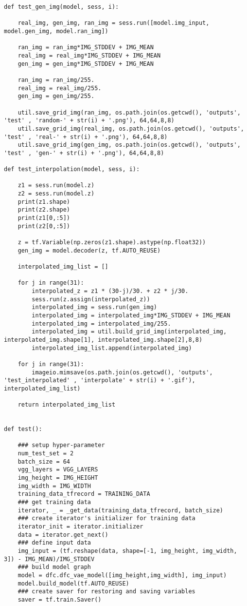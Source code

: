 \begin{footnotesize}
\begin{lstlisting}
def test_gen_img(model, sess, i):
    
    real_img, gen_img, ran_img = sess.run([model.img_input, model.gen_img, model.ran_img])
    
    ran_img = ran_img*IMG_STDDEV + IMG_MEAN
    real_img = real_img*IMG_STDDEV + IMG_MEAN
    gen_img = gen_img*IMG_STDDEV + IMG_MEAN
    
    ran_img = ran_img/255.
    real_img = real_img/255.
    gen_img = gen_img/255.
    
    util.save_grid_img(ran_img, os.path.join(os.getcwd(), 'outputs', 'test' , 'random-' + str(i) + '.png'), 64,64,8,8)
    util.save_grid_img(real_img, os.path.join(os.getcwd(), 'outputs', 'test' , 'real-' + str(i) + '.png'), 64,64,8,8)
    util.save_grid_img(gen_img, os.path.join(os.getcwd(), 'outputs', 'test' , 'gen-' + str(i) + '.png'), 64,64,8,8)
    
def test_interpolation(model, sess, i):
    
    z1 = sess.run(model.z)
    z2 = sess.run(model.z)
    print(z1.shape)
    print(z2.shape)
    print(z1[0,:5])
    print(z2[0,:5])
    
    z = tf.Variable(np.zeros(z1.shape).astype(np.float32))
    gen_img = model.decoder(z, tf.AUTO_REUSE)
    
    interpolated_img_list = []
    
    for j in range(31):
        interpolated_z = z1 * (30-j)/30. + z2 * j/30. 
        sess.run(z.assign(interpolated_z))
        interpolated_img = sess.run(gen_img)
        interpolated_img = interpolated_img*IMG_STDDEV + IMG_MEAN
        interpolated_img = interpolated_img/255.
        interpolated_img = util.build_grid_img(interpolated_img, interpolated_img.shape[1], interpolated_img.shape[2],8,8)
        interpolated_img_list.append(interpolated_img)
        
    for j in range(31):
        imageio.mimsave(os.path.join(os.getcwd(), 'outputs', 'test_interpolated' , 'interpolate' + str(i) + '.gif'), interpolated_img_list)
    
    return interpolated_img_list
    
    
def test():

    ### setup hyper-parameter
    num_test_set = 2
    batch_size = 64
    vgg_layers = VGG_LAYERS
    img_height = IMG_HEIGHT
    img_width = IMG_WIDTH
    training_data_tfrecord = TRAINING_DATA
    ### get training data 
    iterator, _ = _get_data(training_data_tfrecord, batch_size)
	### create iterator's initializer for training data 
    iterator_init = iterator.initializer
    data = iterator.get_next()
    ### define input data
    img_input = (tf.reshape(data, shape=[-1, img_height, img_width, 3]) - IMG_MEAN)/IMG_STDDEV
    ### build model graph
    model = dfc.dfc_vae_model([img_height,img_width], img_input)
    model.build_model(tf.AUTO_REUSE)
    ### create saver for restoring and saving variables
    saver = tf.train.Saver()
    

\end{lstlisting}
\end{footnotesize}

